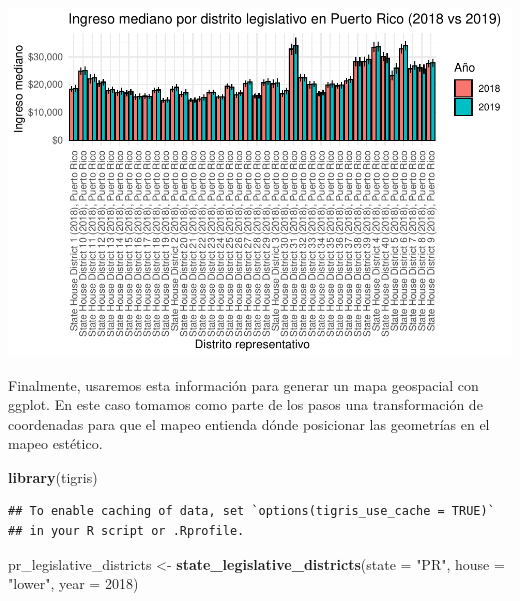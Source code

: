 \documentclass[
]{article}
\newenvironment{Shaded}{\begin{snugshade}}{\end{snugshade}}
\newcommand{\AttributeTok}[1]{\textcolor[rgb]{0.13,0.29,0.53}{#1}}
\newcommand{\DecValTok}[1]{\textcolor[rgb]{0.00,0.00,0.81}{#1}}
\newcommand{\FunctionTok}[1]{\textcolor[rgb]{0.13,0.29,0.53}{\textbf{#1}}}
\newcommand{\NormalTok}[1]{#1}
\newcommand{\OtherTok}[1]{\textcolor[rgb]{0.56,0.35,0.01}{#1}}
\newcommand{\StringTok}[1]{\textcolor[rgb]{0.31,0.60,0.02}{#1}}
\begin{document}
\includegraphics{Taller-2_files/figure-latex/Ingresos por distrito, cambios en encuestas-1.pdf}

Finalmente, usaremos esta información para generar un mapa geospacial
con ggplot. En este caso tomamos como parte de los pasos una
transformación de coordenadas para que el mapeo entienda dónde
posicionar las geometrías en el mapeo estético.

\begin{Shaded}
\begin{Highlighting}[]
\FunctionTok{library}\NormalTok{(tigris)}
\end{Highlighting}
\end{Shaded}

\begin{verbatim}
## To enable caching of data, set `options(tigris_use_cache = TRUE)`
## in your R script or .Rprofile.
\end{verbatim}

\begin{Shaded}
\begin{Highlighting}[]
\NormalTok{pr\_legislative\_districts }\OtherTok{\textless{}{-}} \FunctionTok{state\_legislative\_districts}\NormalTok{(}\AttributeTok{state =} \StringTok{"PR"}\NormalTok{, }\AttributeTok{house =} \StringTok{"lower"}\NormalTok{, }\AttributeTok{year =} \DecValTok{2018}\NormalTok{)}
\end{Highlighting}
\end{Shaded}
\end{document}
